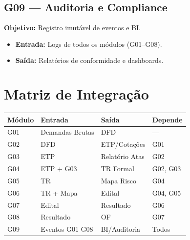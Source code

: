 \documentclass[a4paper,11pt]{article}
\begin{document}
\subsection{G09 --- Auditoria e Compliance}
\textbf{Objetivo:} Registro imutável de eventos e BI.
\begin{itemize}
    \item \textbf{Entrada:} Logs de todos os módulos (G01--G08).
    \item \textbf{Saída:} Relatórios de conformidade e dashboards.
\end{itemize}

\section{Matriz de Integração}
\begin{table}[h]
\centering
\small
\begin{tabularx}{\textwidth}{l X X l}
\toprule
\textbf{Módulo} & \textbf{Entrada} & \textbf{Saída} & \textbf{Depende} \\
\midrule
G01 & Demandas Brutas & DFD & --- \\
G02 & DFD & ETP/Cotações & G01 \\
G03 & ETP & Relatório Atas & G02 \\
G04 & ETP + G03 & TR Formal & G02, G03 \\
G05 & TR & Mapa Risco & G04 \\
G06 & TR + Mapa & Edital & G04, G05 \\
G07 & Edital & Resultado & G06 \\
G08 & Resultado & OF & G07 \\
G09 & Eventos G01-G08 & BI/Auditoria & Todos \\
\bottomrule
\end{tabularx}
\end{table}
\end{document}
